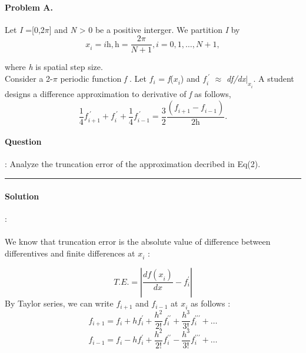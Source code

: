 \documentclass{report}
\begin{document}
\paragraph{Problem A.} Let \textit{I}  =[0,2$\pi$] and \textit{N} > 0 be a positive interger. 
We partition \textit{I} by \\
\begin{equation}
x^{}_{i} = \textit{ih} , \textit{h} = \frac{2\pi}{N+1},  \textit{i} = 0,1,\dots,N + 1, \label{1}
\end{equation}


where \textit{h} is spatial step size.\\


\qquad Consider a 2-$\pi$ periodic function \textit{f} . Let $f^{}_{i}$ = \textit{f}($x^{}_{i}$) and $\textit{f}^{\ \prime}_{i}$ $\approx$ \textit{df/dx}${\vert} ^{}_{x^{}_{i}}$. A student designs a difference approximation to derivative of \textit{f} as follows,
\begin{equation}
\frac{1}{4}\textit{f}^{\ \prime}_{i+1}+\textit{f}^{\ \prime}_{i}+\frac{1}{4}\textit{f}^{\ \prime}_{i-1} = \frac{3}{2}\frac{(\textit{f}^{}_{i+1}-\textit{f}^{}_{i-1})}{2\textit{h}}.\label{2}
\end{equation}
\paragraph{Question}: Analyze the truncation error of the approximation decribed in Eq(2).\\
\noindent\rule[0.25\baselineskip]{\textwidth}{1pt}

\paragraph{Solution}: \\
\\
We know that truncation error is the absolute value of difference between differentives and finite differences at $x^{}_{i}$ :

\begin{equation}
\textit{T.E.} =\left \vert \frac{df(x^{}_{i})}{dx} -f^{ \prime}_{i}\right\vert\label{3}
\end{equation}
By Taylor series, we can write $f^{}_{i+1}$ and $f^{}_{i-1}$ at $x^{}_{i}$ as follows :\\

\begin{equation}
f^{}_{i+1}=f^{}_{i} + hf^{\prime}_{i} + \frac{h^{2}}{2!}f^{\prime\prime}_{i} + \frac{h^{3}}{3!}f^{\prime\prime\prime}_{i}+ \dots \label{4}
\end{equation}
\begin{equation}
f^{}_{i-1} =f^{}_{i} - hf^{\prime}_{i} + \frac{h^{2}}{2!}f^{\prime\prime}_{i} - \frac{h^{3}}{3!}f^{\prime\prime\prime}_{i}+ \dots \label{5}
\end{equation}
\end{document}
